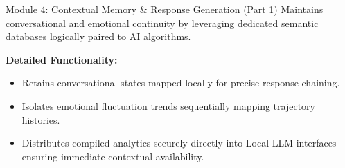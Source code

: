 \documentclass[11pt]{beamer}
\begin{document}
\begin{frame}{Module 4: Contextual Memory \& Response Generation (Part 1)}
Maintains conversational and emotional continuity by leveraging dedicated semantic databases logically paired to AI algorithms.

\vspace{0.3cm}
\textbf{Detailed Functionality:}
\begin{itemize}
    \item Retains conversational states mapped locally for precise response chaining.
    \item Isolates emotional fluctuation trends sequentially mapping trajectory histories.
    \item Distributes compiled analytics securely directly into Local LLM interfaces ensuring immediate contextual availability.
\end{itemize}
\end{frame}
\end{document}
